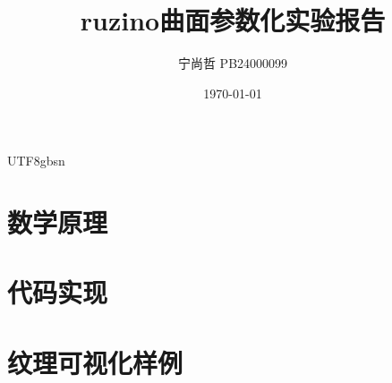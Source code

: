 \documentclass[11pt,a4paper]{article}
\title{ruzino曲面参数化实验报告}
\author{宁尚哲 \quad PB24000099}
\date{\today}
\begin{document}
\begin{CJK*}{UTF8}{gbsn}

\maketitle



\section{数学原理}

\section{代码实现}  


\section{纹理可视化样例}



\end{CJK*} 
\end{document}

